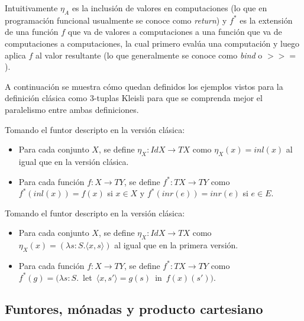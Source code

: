 Intuitivamente $\eta_A$ es la inclusión de valores en computaciones (lo que en programación funcional usualmente se conoce como \textit{return}) y $f^*$ es la extensión de una función $f$ que va de valores a computaciones a una función que va de computaciones a computaciones, la cual primero evalúa una computación y luego aplica $f$ al valor resultante (lo que generalmente se conoce como \textit{bind} o $>$\hspace{-1mm}$>$\hspace{-1mm}$=$).

A continuación se muestra cómo quedan definidos los ejemplos vistos para la definición clásica como 3-tuplas Kleisli para que se comprenda mejor el paralelismo entre ambas definiciones. 

\begin{ejemplo} 
Tomando el funtor descripto en la versión clásica:
\begin{itemize}[noitemsep, label=$\blacktriangleright$]
	\item Para cada conjunto $X$, se define $\eta_X : \mathit{Id} X \rightarrow \mathit{T} X$ como $\eta_X (x) = inl(x)$ al igual que en la versión clásica.
	\item Para cada función $f : X \rightarrow \mathit{T}Y$, se define $f^* : \mathit{T} X \rightarrow \mathit{T} Y$ como \mbox{$f^*(inl(x)) = f(x)$} si $x \in X$ y $f^*(inr(e)) = inr(e)$ si $e \in E$.   
\end{itemize}
\end{ejemplo}

\begin{ejemplo} 
Tomando el funtor descripto en la versión clásica:
\begin{itemize}[noitemsep, label=$\blacktriangleright$]
	\item Para cada conjunto $X$, se define $\eta_X : \mathit{Id} X \rightarrow \mathit{T} X$ como $\eta_X (x) = (\lambda s : S . \langle x , s \rangle)$ al igual que en la primera versión.
	\item Para cada función $f : X \rightarrow \mathit{T}Y$, se define $f^* : \mathit{T} X \rightarrow \mathit{T} Y$ como \\ \mbox{$f^*(g) = (\lambda s : S .$ let $\langle x , s' \rangle = g(s)$ in $f(x)(s'))$}.
\end{itemize}
\end{ejemplo}

\subsection{Funtores, mónadas y producto cartesiano}\label{monadas:cartesian}

